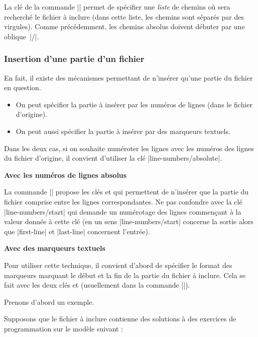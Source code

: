 \documentclass[dvipsnames,svgnames]{article}
\begin{document}
La clé  de la commande |\PitonOptions| permet de spécifier une
\emph{liste} de chemins où sera recherché le fichier à inclure (dans cette liste, les
chemins sont séparés par des virgules). Comme précédemment, les chemins absolus doivent
débuter par une oblique~|/|.


\subsubsection{Insertion d'une partie d'un fichier}

\label{part-of-a-file}

En fait, il existe des mécanismes permettant de n'insérer qu'une partie du fichier en
question.
\begin{itemize}
\item On peut spécifier la partie à insérer par les numéros de lignes (dans le fichier
d'origine).
\item On peut aussi spécifier la partie à insérer par des marqueurs textuels.
\end{itemize}
Dans les deux cas, si on souhaite numéroter les lignes avec les numéros des lignes du
fichier d'origine, il convient d'utiliser la clé |line-numbers/absolute|.

\bigskip
\textbf{Avec les numéros de lignes absolus}\par\nobreak

La commande |\PitonInputFile| propose les clés  et
 qui permettent de n'insérer que la partie du fichier comprise entre
les lignes correspondantes. Ne pas confondre avec la clé |line-numbers/start| qui demande
un numérotage des lignes commençant à la valeur donnée à cette clé (en un sens
|line-numbers/start| concerne la sortie alors que |first-line| et |last-line| concernent
l'entrée).

\bigskip
\textbf{Avec des marqueurs textuels}\par\nobreak



Pour utiliser cette technique, il convient d'abord de spécifier le format des marqueurs
marquant le début et la fin de la partie du fichier à inclure. Cela se fait avec les deux
clés  et  (usuellement dans la
commande |\PitonOptions|).

\medskip
Prenons d'abord un exemple.

\medskip
Supposons que le fichier à inclure contienne des solutions à des exercices de
programmation sur le modèle suivant :
\end{document}
